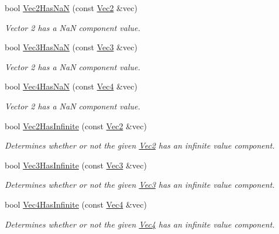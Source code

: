 \begin{DoxyCompactItemize}
bool \hyperlink{group___s_i_s_d_vec_math_ga7b340b1e4dd88d99aba27f41cd0c1d17}{Vec2\+Has\+Na\+N} (const \hyperlink{classgofxmath_1_1_vec2}{Vec2} \&vec)
\begin{DoxyCompactList}\small\item\em Vector 2 has a Na\+N component value. \end{DoxyCompactList}\item 
bool \hyperlink{group___s_i_s_d_vec_math_ga5d19e3d1ee15741a65ede16f20e919a4}{Vec3\+Has\+Na\+N} (const \hyperlink{classgofxmath_1_1_vec3}{Vec3} \&vec)
\begin{DoxyCompactList}\small\item\em Vector 2 has a Na\+N component value. \end{DoxyCompactList}\item 
bool \hyperlink{group___s_i_s_d_vec_math_gab82fdfebe73934664b56e9ba1174f37f}{Vec4\+Has\+Na\+N} (const \hyperlink{classgofxmath_1_1_vec4}{Vec4} \&vec)
\begin{DoxyCompactList}\small\item\em Vector 2 has a Na\+N component value. \end{DoxyCompactList}\item 
bool \hyperlink{group___s_i_s_d_vec_math_ga6eb96a6532361189c7cacdbd9ae95c90}{Vec2\+Has\+Infinite} (const \hyperlink{classgofxmath_1_1_vec2}{Vec2} \&vec)
\begin{DoxyCompactList}\small\item\em Determines whether or not the given \hyperlink{classgofxmath_1_1_vec2}{Vec2} has an infinite value component. \end{DoxyCompactList}\item 
bool \hyperlink{group___s_i_s_d_vec_math_gae5205e805b23de865db9a40e5936f82a}{Vec3\+Has\+Infinite} (const \hyperlink{classgofxmath_1_1_vec3}{Vec3} \&vec)
\begin{DoxyCompactList}\small\item\em Determines whether or not the given \hyperlink{classgofxmath_1_1_vec3}{Vec3} has an infinite value component. \end{DoxyCompactList}\item 
bool \hyperlink{group___s_i_s_d_vec_math_ga29cd467d514b701c3a796cb75234be0b}{Vec4\+Has\+Infinite} (const \hyperlink{classgofxmath_1_1_vec4}{Vec4} \&vec)
\begin{DoxyCompactList}\small\item\em Determines whether or not the given \hyperlink{classgofxmath_1_1_vec4}{Vec4} has an infinite value component. \end{DoxyCompactList}\item 

\end{DoxyCompactItemize}
